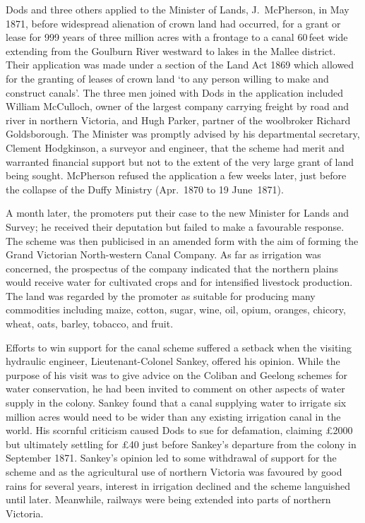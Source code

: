 Dods and three others applied to the Minister of Lands, J.~McPherson,
in May 1871, before widespread alienation of crown land had occurred,
for a grant or lease for 999 years of three million acres with a
frontage to a canal 60\,feet wide extending from the Goulburn River
 westward to lakes in the Mallee
district.  Their application was made under a
section of the Land Act 1869 which allowed for the granting of leases
of crown land `to any person willing to make and construct canals'.
The three men joined with Dods in the application included William
McCulloch,  owner of the largest company carrying
freight by road and river in northern Victoria, and Hugh Parker,
partner of the woolbroker Richard Goldsborough.   The Minister was promptly advised by his departmental secretary,
Clement Hodgkinson,  a surveyor and engineer,
that the scheme had merit and warranted financial support but not to
the extent of the very large grant of land being sought.  McPherson
refused the application a few weeks later, just before the collapse of
the Duffy Ministry (Apr.\ 1870 to 19 June~1871).

A month later, the promoters put their case to the new Minister for
Lands and Survey; he received their deputation but failed to make a
favourable response.  The scheme was then publicised in an amended
form with the aim of forming the Grand Victorian North-western Canal
Company.   As far as
irrigation was concerned, the prospectus of the company indicated that
the northern plains would receive water for cultivated crops and for
intensified livestock production.  The land was regarded by the
promoter as suitable for producing many commodities including maize,
cotton, sugar, wine, oil, opium, oranges, chicory, wheat, oats,
barley, tobacco, and fruit.

Efforts to win support for the canal scheme suffered a setback when
the visiting hydraulic engineer, Lieutenant-Colonel Sankey,
  offered
his opinion.  While the purpose of his visit was to give advice on the
Coliban and Geelong schemes for water conservation, he had been
invited to comment on other aspects of water supply in the colony.
Sankey found that a canal supplying water to irrigate six million
acres would need to be wider than any existing irrigation canal in the
world.  His scornful criticism caused Dods to sue for defamation,
claiming \pounds2000 but ultimately settling for \pounds40 just before
Sankey's departure from the colony in September 1871. Sankey's opinion
led to some withdrawal of support for the scheme and as the
agricultural use of northern Victoria was favoured by good rains for
several years, interest in irrigation declined and the scheme
languished until later.  Meanwhile, railways  were
being extended into parts of northern Victoria.

